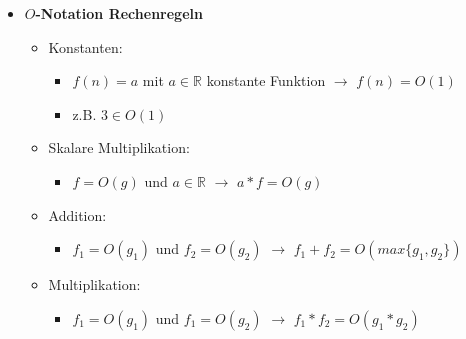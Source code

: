 \documentclass[
    ngerman,
    color=3b,
    load_common, %
    summary,
    boxarc,
]{tuda_summary}
\begin{document}
\begin{itemize}
    \item \textbf{$O$-Notation Rechenregeln}
          \begin{itemize}
              \item Konstanten:
                    \begin{itemize}
                        \item $f(n) = a$ mit $a \in \mathbb{R}$ konstante Funktion $\rightarrow$ $f(n) = O(1)$
                        \item z.B. $3 \in O(1)$
                    \end{itemize}

              \item Skalare Multiplikation:
                    \begin{itemize}
                        \item $f= O(g)$ und $a \in \mathbb{R}$ $\rightarrow$ $a*f = O(g)$
                    \end{itemize}

              \item Addition:
                    \begin{itemize}
                        \item $f_1 = O(g_1)$ und $f_2 = O(g_2)$ $\rightarrow$ $f_1+f_2= O(max\{g_1,g_2\})$
                    \end{itemize}

              \item Multiplikation:
                    \begin{itemize}
                        \item $f_1 = O(g_1)$ und $f_1 = O(g_2)$ $\rightarrow$ $f_1*f_2= O(g_1*g_2)$
                    \end{itemize}
          \end{itemize}

          \pagebreak


\end{itemize}
\end{document}
